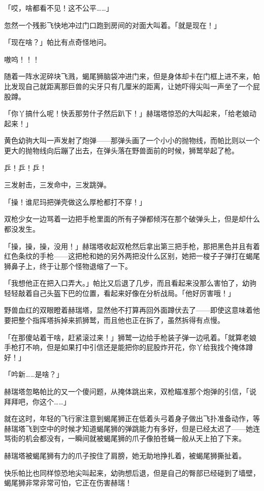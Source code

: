 「哎，啥都看不见！这不公平……」

忽然一个残影飞快地冲过门口跑到房间的对面大叫着。「就是现在！」

「现在啥？」帕比有点奇怪地问。

嗷呜！！！

随着一阵水泥碎块飞溅，蝎尾狮脑袋冲进门来，但是身体却卡在门框上进不来，帕比发现自己就距离那巨兽的尖牙只有几厘米的距离，让她吓得尖叫一声坐了一个屁股蹲。

「你丫搞什么呢！快丢那劳什子然后趴下！」赫瑞塔惊恐的大叫起来，「给老娘动起来！」

黄色幼驹大叫一声发射了炮弹——那弹头画了一个小小的抛物线，而帕比则以一个更大的抛物线向后蹦了出去，在弹头落在野兽面前的时候，狮鹫举起了枪。

乒！乒！乒！


三发射击，三发命中，三发跳弹。

「操！谁尼玛把弹壳做这么厚枪都打不穿！」

双枪少女一边骂着一边把手枪里面的所有子弹都倾泻在那个破弹头上，但是却什么都没发生。

「操，操，操，没用！」赫瑞塔收起双枪然后拿出第三把手枪，那把黑色并且有着红色条纹的手枪——这把枪和她的另外两把没什么区别，她把一梭子子弹打在蝎尾狮鼻子上，终于让那个怪物退缩了一下。

「我想他正在把入口弄大。」帕比又后退了几步，而且看起来没那么害怕了，幼驹轻轻敲着自己头盔下巴的位置，看起来好像在分析战局。「他好厉害哦！」

野兽血红的双眼瞪着赫瑞塔，显然他不打算再回外面蹲伏去了——即使这意味着他要把整个指挥塔拆掉来抓狮鹫，而且他也正在拆了，虽然拆得有点慢。

「在那傻站着干啥，赶紧滚过来！」狮鹫一边给手枪装子弹一边吼着。「就算老娘手枪打不响，但是如果打中引信还是能把你的屁股炸开花，你丫给我找个掩体蹲好！」

「吟新……是啥？」

赫瑞塔忽略帕比的又一个傻问题，从掩体跳出来，双枪瞄准那个炮弹的引信，「说拜拜吧，你这个……」

就在这时，年轻的飞行家注意到蝎尾狮正在低着头弓着身子做出飞扑准备动作，等赫瑞塔飞到空中的时候才知道蝎尾狮的弹跳能力有多好，但是已经太迟了——她连骂街的机会都没有，一瞬间就被蝎尾狮的爪子像拍苍蝇一般从天上拍了下来。

赫瑞塔被蝎尾狮有力的爪子按住了肩膀，她无助地挣扎着，被蝎尾狮撕扯着。

快乐帕比也同样惊恐地尖叫起来，幼驹想后退，但是自己的臀部已经碰到了墙壁，蝎尾狮非常非常可怕，它正在伤害赫瑞！

